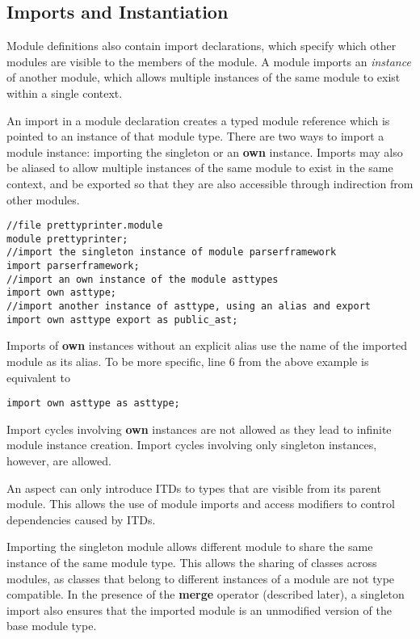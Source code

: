 \subsection{Imports and Instantiation}

Module definitions also contain import declarations, which specify which
other modules are visible to the members of the module. A module imports 
an \textit{instance} of another module, which allows multiple instances
of the same module to exist within a single context.

An import in a module declaration creates a typed module reference which is pointed to
an instance of that module type. 
There are two ways to import a module instance: importing the singleton or
an \textbf{own} instance. Imports may also be aliased to allow multiple instances
of the same module to exist in the same context, and be exported so that
they are also accessible through indirection from other modules.

\begin{lstlisting}[caption={Imports}, label={figure:imports}]
//file prettyprinter.module
module prettyprinter;
//import the singleton instance of module parserframework
import parserframework; 
//import an own instance of the module asttypes
import own asttype;
//import another instance of asttype, using an alias and export
import own asttype export as public_ast;
\end{lstlisting}

Imports of \textbf{own} instances without an explicit alias use the name
of the imported module as its alias. To be more specific, line 6 from the above
example is equivalent to
\begin{lstlisting}
import own asttype as asttype;
\end{lstlisting}

Import cycles involving \textbf{own} instances are not allowed as they
lead to infinite module instance creation. Import cycles involving only
singleton instances, however, are allowed.

An aspect can only introduce ITDs to types that are visible from its parent module. 
This allows the use of module imports and access modifiers to control dependencies
caused by ITDs.

Importing the singleton module allows different module to share the same instance
of the same module type. This allows the sharing of classes across modules, as
classes that belong to different instances of a module are not type compatible.
In the presence of the \textbf{merge} operator (described later), a singleton import
also ensures that the imported module is an unmodified version of the base module type.


